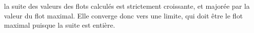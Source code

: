 la suite des valeurs des flots calculés est strictement croissante, et majorée par la valeur du flot maximal. Elle converge donc vers une limite, qui doit être le flot maximal puisque la suite est entière.